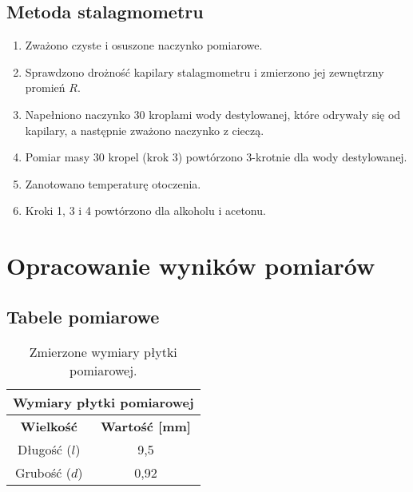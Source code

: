 \documentclass[a4paper,12pt]{article}
\begin{document}
\subsection{Metoda stalagmometru}
\begin{enumerate}
    \item Zważono czyste i osuszone naczynko pomiarowe.
    \item Sprawdzono drożność kapilary stalagmometru i zmierzono jej zewnętrzny promień $R$.
    \item Napełniono naczynko 30 kroplami wody destylowanej, które odrywały się od kapilary, a następnie zważono naczynko z cieczą.
    \item Pomiar masy 30 kropel (krok 3) powtórzono 3-krotnie dla wody destylowanej.
    \item Zanotowano temperaturę otoczenia.
    \item Kroki 1, 3 i 4 powtórzono dla alkoholu i acetonu.
\end{enumerate}

\section{Opracowanie wyników pomiarów}

\subsection{Tabele pomiarowe}

\begin{table}[h!]
    \centering
    \begin{tabular}{|c|c|}
        \hline
        \multicolumn{2}{|c|}{\textbf{Wymiary płytki pomiarowej}} \\
        \hline
        \textbf{Wielkość} & \textbf{Wartość [mm]} \\
        \hline
        Długość ($l$) & 9{,}5 \\
        \hline
        Grubość ($d$) & 0{,}92 \\
        \hline
    \end{tabular}
    \caption{Zmierzone wymiary płytki pomiarowej.}
    \label{tab:wymiary_plytki}
\end{table}
\end{document}
